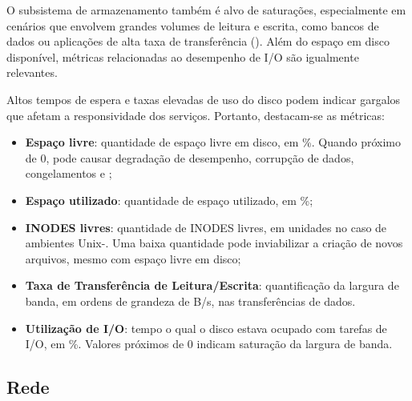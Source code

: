 O subsistema de armazenamento também é alvo de saturações, especialmente em cenários que envolvem grandes volumes de leitura e escrita, como bancos de dados ou aplicações de alta taxa de transferência (). Além do espaço em disco disponível, métricas relacionadas ao desempenho de I/O são igualmente relevantes.

Altos tempos de espera e taxas elevadas de uso do disco podem indicar gargalos que afetam a responsividade dos serviços. Portanto, destacam-se as métricas:

\begin{itemize}
\item \textbf{Espaço livre}: quantidade de espaço livre em disco, em \%. Quando próximo de 0, pode causar degradação de desempenho, corrupção de dados, congelamentos e ;

\item \textbf{Espaço utilizado}: quantidade de espaço utilizado, em \%;

\item \textbf{INODES livres}: quantidade de INODES livres, em unidades no caso de ambientes Unix-. Uma baixa quantidade pode inviabilizar a criação de novos arquivos, mesmo com espaço livre em disco;

\item \textbf{Taxa de Transferência de Leitura/Escrita}: quantificação da largura de banda, em ordens de grandeza de B/s, nas transferências de dados.

\item \textbf{Utilização de I/O}: tempo o qual o disco estava ocupado com tarefas de I/O, em \%. Valores próximos de 0 indicam saturação da largura de banda.
\end{itemize}

\subsection{Rede}
\label{subsection:Rede}

